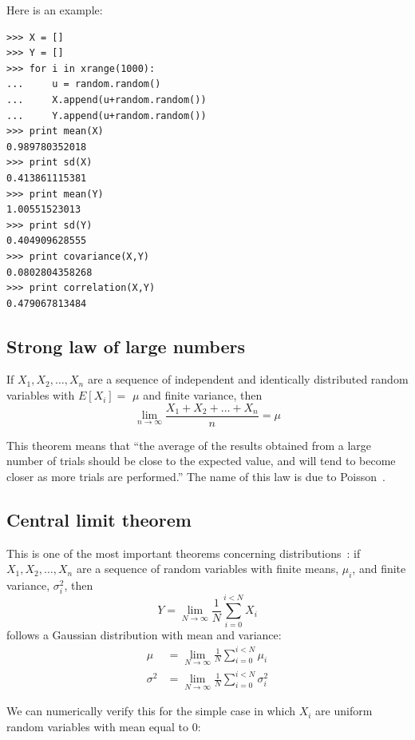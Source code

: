\documentclass[justified,sixbynine]{tufte-book}
\def\ft{\small\tt}
\theoremstyle{plain}%
\theoremstyle{definition}
\theoremstyle{remark}
\begin{document}
\begin{fullwidth}
Here is an example:
\begin{lstlisting}[caption={in file: {\ft nlib.py}}]
>>> X = []
>>> Y = []
>>> for i in xrange(1000):
...     u = random.random()
...     X.append(u+random.random())
...     Y.append(u+random.random())
>>> print mean(X)
0.989780352018
>>> print sd(X)
0.413861115381
>>> print mean(Y)
1.00551523013
>>> print sd(Y)
0.404909628555
>>> print covariance(X,Y)
0.0802804358268
>>> print correlation(X,Y)
0.479067813484
\end{lstlisting}

\goodbreak\subsection{Strong law of large numbers}

If $X_1,X_2,\dots,X_n$ are a sequence of independent and identically
distributed random variables with $E[X_i]=$ $\mu $ and finite variance, then
\begin{equation}
\lim_{n\rightarrow \infty }\frac{X_1+X_2+\dots+X_n}n=\mu
\end{equation}

This theorem means that ``the average of the results obtained from a large number of trials should be close to the expected value, and will tend to become closer as more trials are performed.'' The name of this law is due to Poisson~\cite{largenumbers}.

\goodbreak\subsection{Central limit theorem}

This is one of the most important theorems concerning distributions~\cite{central}:
if $X_1,X_2,\dots,X_n$ are a sequence of random variables with finite means, $\mu_i$, and finite variance, $\sigma^2_i$, then
\begin{equation}
Y = \lim_{N\rightarrow\infty}\frac1N \sum_{i=0}^{i<N} X_i
\end{equation}
follows a Gaussian distribution with mean and variance:
\begin{align}
\mu &= \lim_{N\rightarrow\infty}\frac1N \sum_{i=0}^{i<N} \mu_i \\
\sigma^2 &= \lim_{N\rightarrow\infty}\frac1N \sum_{i=0}^{i<N} \sigma^2_i
\end{align}

We can numerically verify this for the simple case in which $X_i$ are uniform random variables with mean equal to 0:


\end{fullwidth}
\end{document}
